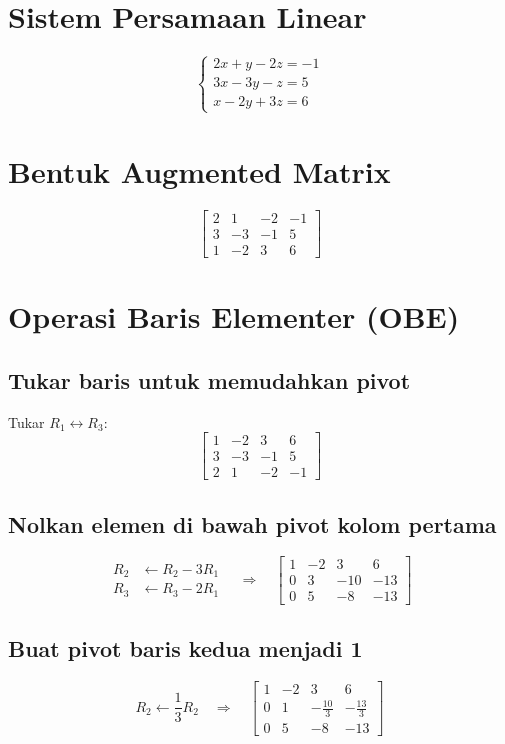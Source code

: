 \documentclass[12pt]{article}
\title{}
\author{}
\date{}
\begin{document}
\section*{Sistem Persamaan Linear}
\[
\begin{cases}
2x + y - 2z = -1 \\
3x - 3y - z = 5 \\
x - 2y + 3z = 6
\end{cases}
\]

\section*{Bentuk Augmented Matrix}
\[
\left[\begin{array}{ccc|c}
2 & 1 & -2 & -1 \\
3 & -3 & -1 & 5 \\
1 & -2 & 3 & 6
\end{array}\right]
\]

\section*{Operasi Baris Elementer (OBE)}

\subsection*{Tukar baris untuk memudahkan pivot}
Tukar \( R_1 \leftrightarrow R_3 \):
\[
\left[\begin{array}{ccc|c}
1 & -2 & 3 & 6 \\
3 & -3 & -1 & 5 \\
2 & 1 & -2 & -1
\end{array}\right]
\]

\subsection*{Nolkan elemen di bawah pivot kolom pertama}
\[
\begin{aligned}
R_2 &\leftarrow R_2 - 3R_1 \\
R_3 &\leftarrow R_3 - 2R_1
\end{aligned}
\quad \Rightarrow \quad
\left[\begin{array}{ccc|c}
1 & -2 & 3 & 6 \\
0 & 3 & -10 & -13 \\
0 & 5 & -8 & -13
\end{array}\right]
\]

\subsection*{Buat pivot baris kedua menjadi 1}
\[
R_2 \leftarrow \frac{1}{3}R_2 \quad \Rightarrow \quad
\left[\begin{array}{ccc|c}
1 & -2 & 3 & 6 \\
0 & 1 & -\frac{10}{3} & -\frac{13}{3} \\
0 & 5 & -8 & -13
\end{array}\right]
\]
\end{document}
